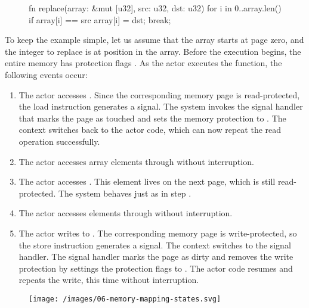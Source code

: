 \documentclass{article}
\begin{document}
\begin{figure}
\begin{code}[rust]
fn replace(array: &mut [u32], src: u32, dst: u32) {
  for i in 0..array.len() {
    if array[i] == src {
      array[i] = dst;
      break;
    }
  }
}
\end{code}
\end{figure}

To keep the example simple, let us assume that the array starts at page zero, and the integer to replace is at position  in the array.
Before the execution begins, the entire memory has protection flags .
As the actor executes the  function, the following events occur:
\begin{enumerate}
  \item
    The actor accesses .
    Since the corresponding memory page is read-protected, the load instruction generates a  signal.
    The system invokes the signal handler that marks the page as touched and sets the memory protection to .
    The context switches back to the actor code, which can now repeat the read operation successfully.
  \item
    The actor accesses array elements  through  without interruption.
  \item
    The actor accesses .
    This element lives on the next page, which is still read-protected.
    The system behaves just as in step .
  \item
    The actor accesses elements  through  without interruption.
  \item
    The actor writes to .
    The corresponding memory page is write-protected, so the store instruction generates a  signal.
    The context switches to the signal handler.
    The signal handler marks the page as dirty and removes the write protection by settings the protection flags to .
    The actor code resumes and repeats the write, this time without interruption.
\end{enumerate}

\begin{figure}[grayscale-diagram]
\texttt{[image: /images/06-memory-mapping-states.svg]}
\end{figure}
\end{document}

